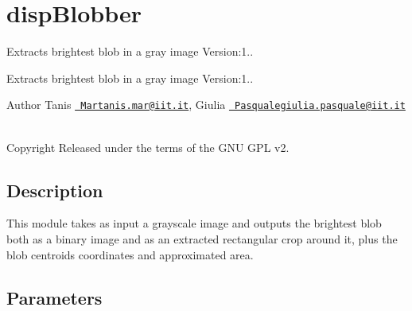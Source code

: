 \section{disp\+Blobber}
\label{group__dispBlobber}


Extracts brightest blob in a gray image Version\+:1..  


Extracts brightest blob in a gray image Version\+:1.. 

\begin{DoxyAuthor}{Author}
Tanis \href{mailto:Martanis.mar@iit.it}{\texttt{ Martanis.\+mar@iit.\+it}}, Giulia \href{mailto:Pasqualegiulia.pasquale@iit.it}{\texttt{ Pasqualegiulia.\+pasquale@iit.\+it}} ~\newline
 
\end{DoxyAuthor}
\begin{DoxyCopyright}{Copyright}
Released under the terms of the G\+NU G\+PL v2. 
\end{DoxyCopyright}
\hypertarget{group__seg2cloud_intro_sec}{}\subsection{Description}\label{group__seg2cloud_intro_sec}
This module takes as input a grayscale image and outputs the brightest blob both as a binary image and as an extracted rectangular crop around it, plus the blob centroid\textquotesingle{}s coordinates and approximated area.\hypertarget{group__seg2cloud_parameters_sec}{}\subsection{Parameters}\label{group__seg2cloud_parameters_sec}

